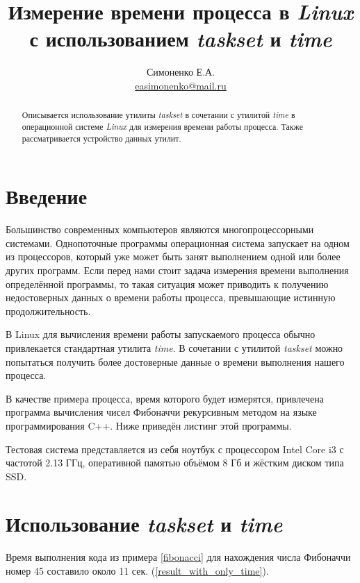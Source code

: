 \documentclass[12pt,a4paper]{article}
\title{Измерение времени процесса в \textit{Linux} с использованием \textit{taskset} и \textit{time}}
\author{Симоненко Е.А. \\
\href{mailto:easimonenko@mail.ru}{easimonenko@mail.ru}}
\begin{document}
\maketitle

\begin{abstract}Описывается использование утилиты \textit{taskset} в сочетании с утилитой \textit{time} в операционной 
системе \textit{Linux} для измерения времени работы процесса. Также рассматривается устройство данных утилит.
\end{abstract}

\section*{Введение}

Большинство современных компьютеров являются многопроцессорными системами. Однопоточные программы операционная система 
запускает на одном из процессоров, который уже может быть занят выполнением одной или более других программ. Если перед 
нами стоит задача измерения времени выполнения определённой программы, то такая ситуация может приводить к получению 
недостоверных данных о времени работы процесса, превышающие истинную продолжительность.

В Linux для вычисления времени работы запускаемого процесса обычно привлекается стандартная утилита \textit{time}. В 
сочетании с утилитой \textit{taskset} можно попытаться получить более достоверные данные о времени выполнения нашего 
процесса.

В качестве примера процесса, время которого будет измерятся, привлечена программа вычисления чисел Фибоначчи 
рекурсивным методом на языке программирования C++. Ниже приведён листинг этой программы.



Тестовая система представляется из себя ноутбук с процессором Intel Core i3 с частотой 2.13 ГГц, оперативной памятью 
объёмом 8 Гб и жёстким диском типа SSD.

\section{Использование \textit{taskset} и \textit{time}}

Время выполнения кода из примера \ref{fibonacci} для нахождения числа Фибоначчи номер 45 составило около 11 сек. 
(\ref{result_with_only_time}).
\end{document}
